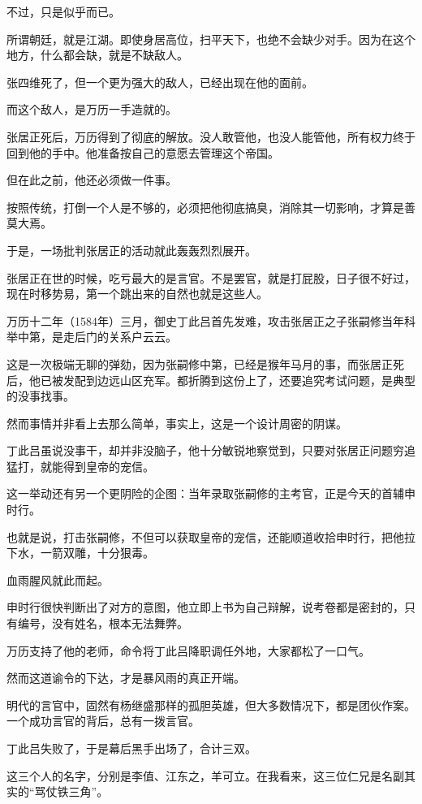\begin{multicols}{\theparacolNo}
		不过，只是似乎而已。

		所谓朝廷，就是江湖。即使身居高位，扫平天下，也绝不会缺少对手。因为在这个地方，什么都会缺，就是不缺敌人。

		张四维死了，但一个更为强大的敌人，已经出现在他的面前。

		而这个敌人，是万历一手造就的。

		张居正死后，万历得到了彻底的解放。没人敢管他，也没人能管他，所有权力终于回到他的手中。他准备按自己的意愿去管理这个帝国。

		但在此之前，他还必须做一件事。

		按照传统，打倒一个人是不够的，必须把他彻底搞臭，消除其一切影响，才算是善莫大焉。

		于是，一场批判张居正的活动就此轰轰烈烈展开。

		张居正在世的时候，吃亏最大的是言官。不是罢官，就是打屁股，日子很不好过，现在时移势易，第一个跳出来的自然也就是这些人。

		万历十二年（1584年）三月，御史丁此吕首先发难，攻击张居正之子张嗣修当年科举中第，是走后门的关系户云云。

		这是一次极端无聊的弹劾，因为张嗣修中第，已经是猴年马月的事，而张居正死后，他已被发配到边远山区充军。都折腾到这份上了，还要追究考试问题，是典型的没事找事。

		然而事情并非看上去那么简单，事实上，这是一个设计周密的阴谋。

		丁此吕虽说没事干，却并非没脑子，他十分敏锐地察觉到，只要对张居正问题穷追猛打，就能得到皇帝的宠信。

		这一举动还有另一个更阴险的企图：当年录取张嗣修的主考官，正是今天的首辅申时行。

		也就是说，打击张嗣修，不但可以获取皇帝的宠信，还能顺道收拾申时行，把他拉下水，一箭双雕，十分狠毒。

		血雨腥风就此而起。

		申时行很快判断出了对方的意图，他立即上书为自己辩解，说考卷都是密封的，只有编号，没有姓名，根本无法舞弊。

		万历支持了他的老师，命令将丁此吕降职调任外地，大家都松了一口气。

		然而这道谕令的下达，才是暴风雨的真正开端。

		明代的言官中，固然有杨继盛那样的孤胆英雄，但大多数情况下，都是团伙作案。一个成功言官的背后，总有一拨言官。

		丁此吕失败了，于是幕后黑手出场了，合计三双。

		这三个人的名字，分别是李值、江东之，羊可立。在我看来，这三位仁兄是名副其实的“骂仗铁三角”。


\end{multicols}
